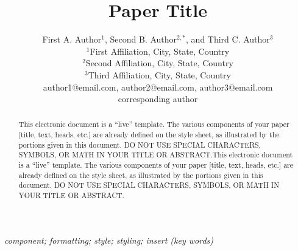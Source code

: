\documentclass[conference]{IEEEconf}
\begin{document}
\title{\textbf{\Large Paper Title\\}}

\author{First A. Author$^{1}$, Second B. Author$^{2,*}$, and Third C. Author$^{3}$\\
	\normalsize $^{1}$First Affiliation, City, State, Country\\
	\normalsize $^{2}$Second Affiliation, City, State, Country\\
	\normalsize $^{3}$Third Affiliation, City, State, Country\\
	\normalsize author1@email.com, author2@email.com, author3@email.com\\
	\normalsize *corresponding author
}


\maketitle
\begin{abstract}
This electronic document is a “live” template. The various components of your paper [title, text, heads, etc.] are already defined on the style sheet, as illustrated by the portions given in this document. DO NOT USE SPECIAL CHARACTERS, SYMBOLS, OR MATH IN YOUR TITLE OR ABSTRACT.This electronic document is a “live” template. The various components of your paper [title, text, heads, etc.] are already defined on the style sheet, as illustrated by the portions given in this document. DO NOT USE SPECIAL CHARACTERS, SYMBOLS, OR MATH IN YOUR TITLE OR ABSTRACT.
\end{abstract}
\IEEEoverridecommandlockouts
\vspace{1.5ex}
\begin{keywords}
\itshape component; formatting; style; styling; insert (key words)
\end{keywords}

%
\IEEEpeerreviewmaketitle
\end{document}
